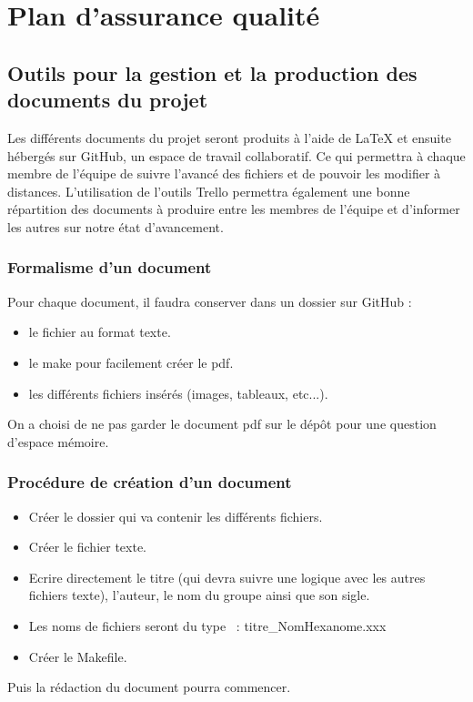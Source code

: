 \chapter{Plan d'assurance qualité}

\section{Outils pour la gestion et la production des documents du projet}

	Les différents documents du projet seront produits à l'aide de LaTeX et ensuite hébergés sur GitHub, un espace de travail collaboratif. Ce qui permettra à chaque membre de l'équipe de suivre l'avancé des fichiers et de pouvoir les modifier à distances. 
	L'utilisation de l'outils Trello permettra également une bonne répartition des documents à produire entre les membres de l'équipe et d'informer les autres sur notre état d'avancement.

\subsection{Formalisme d'un document}

Pour chaque document, il faudra conserver dans un dossier sur GitHub :
\begin{itemize}
    \item le fichier au format texte.
    \item le make pour facilement créer le pdf.
    \item les différents fichiers insérés (images, tableaux, etc...).
\end{itemize}
On a choisi de ne pas garder le document pdf sur le dépôt pour une question d'espace mémoire.
\subsection{Procédure de création d'un document}

\begin{itemize}
    \item Créer le dossier qui va contenir les différents fichiers.
    \item Créer le fichier texte.
    \item Ecrire directement le titre (qui devra suivre une logique avec les autres fichiers texte), l'auteur, le nom du groupe ainsi que son sigle.
    \item Les noms de fichiers seront du type  : titre_NomHexanome.xxx
   \item Créer le Makefile.
\end{itemize}
Puis la rédaction du document pourra commencer.

